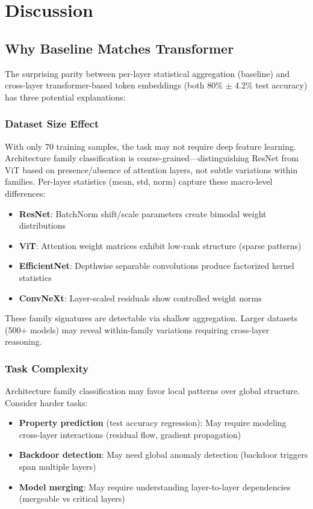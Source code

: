 \section{Discussion}

\subsection{Why Baseline Matches Transformer}

The surprising parity between per-layer statistical aggregation (baseline) and cross-layer transformer-based token embeddings (both 80\% $\pm$ 4.2\% test accuracy) has three potential explanations:

\subsubsection{Dataset Size Effect}

With only 70 training samples, the task may not require deep feature learning. Architecture family classification is coarse-grained—distinguishing ResNet from ViT based on presence/absence of attention layers, not subtle variations within families. Per-layer statistics (mean, std, norm) capture these macro-level differences:

\begin{itemize}
\item \textbf{ResNet}: BatchNorm shift/scale parameters create bimodal weight distributions
\item \textbf{ViT}: Attention weight matrices exhibit low-rank structure (sparse patterns)
\item \textbf{EfficientNet}: Depthwise separable convolutions produce factorized kernel statistics
\item \textbf{ConvNeXt}: Layer-scaled residuals show controlled weight norms
\end{itemize}

These family signatures are detectable via shallow aggregation. Larger datasets (500+ models) may reveal within-family variations requiring cross-layer reasoning.

\subsubsection{Task Complexity}

Architecture family classification may favor local patterns over global structure. Consider harder tasks:

\begin{itemize}
\item \textbf{Property prediction} (test accuracy regression): May require modeling cross-layer interactions (residual flow, gradient propagation)
\item \textbf{Backdoor detection}: May need global anomaly detection (backdoor triggers span multiple layers)
\item \textbf{Model merging}: May require understanding layer-to-layer dependencies (mergeable vs critical layers)
\end{itemize}

